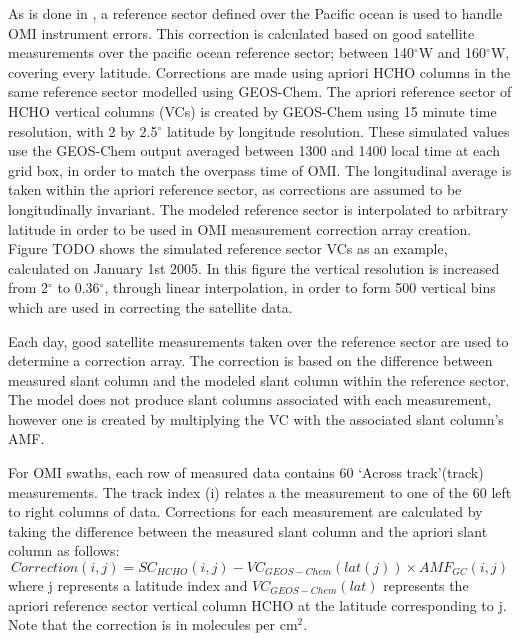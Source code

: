     As is done in \citet{Gonzalez2015}, a reference sector defined over the Pacific ocean is used to handle OMI instrument errors.
    This correction is calculated based on good satellite measurements over the pacific ocean reference sector; between 140$^{\circ}$W and 160$^{\circ}$W, covering every latitude.
    Corrections are made using apriori HCHO columns in the same reference sector modelled using GEOS-Chem.
    The apriori reference sector of HCHO vertical columns (VCs) is created by GEOS-Chem using 15 minute time resolution, with 2 by 2.5$^{\circ}$ latitude by longitude resolution.
    These simulated values use the GEOS-Chem output averaged between 1300 and 1400 local time at each grid box, in order to match the overpass time of OMI.
    The longitudinal average is taken within the apriori reference sector, as corrections are assumed to be longitudinally invariant.
    The modeled reference sector is interpolated to arbitrary latitude in order to be used in OMI measurement correction array creation.
    Figure TODO shows the simulated reference sector VCs as an example, calculated on January 1st 2005.
    In this figure the vertical resolution is increased from 2$^{\circ}$ to 0.36$^{\circ}$, through linear interpolation, in order to form 500 vertical bins which are used in correcting the satellite data.
    
    Each day, good satellite measurements taken over the reference sector are used to determine a correction array.
    The correction is based on the difference between measured slant column and the modeled slant column within the reference sector.
    The model does not produce slant columns associated with each measurement, however one is created by multiplying the VC with the associated slant column's AMF.
    
    For OMI swaths, each row of measured data contains 60 `Across track'(track) measurements.
    The track index (i) relates a the measurement to one of the 60 left to right columns of data.
    Corrections for each measurement are calculated by taking the difference between the measured slant column and the apriori slant column as follows:
    \begin{equation} \label{ch_isop:eqn:reference_sector_correction}
      Correction(i,j) = SC_{HCHO}(i,j) - VC_{GEOS-Chem}(lat(j)) \times {AMF_{GC}}(i,j)
    \end{equation}
    where j represents a latitude index and $VC_{GEOS-Chem}(lat)$ represents the apriori reference sector vertical column HCHO at the latitude corresponding to j.
    Note that the correction is in molecules per cm$^2$.
    
